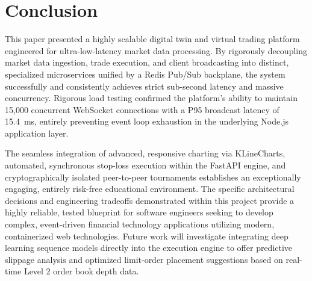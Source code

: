 \documentclass[conference]{IEEEtran}
\begin{document}
\begin{table}[h]
\centering
\caption{Projected SaaS Infrastructure Costs (Per 10,000 Users)}
\label{tab:budget}
\end{table}

\section{Conclusion}

This paper presented a highly scalable digital twin and virtual trading platform engineered for ultra-low-latency market data processing. By rigorously decoupling market data ingestion, trade execution, and client broadcasting into distinct, specialized microservices unified by a Redis Pub/Sub backplane, the system successfully and consistently achieves strict sub-second latency and massive concurrency. Rigorous load testing confirmed the platform's ability to maintain 15,000 concurrent WebSocket connections with a P95 broadcast latency of 15.4~ms, entirely preventing event loop exhaustion in the underlying Node.js application layer. 

The seamless integration of advanced, responsive charting via KLineCharts, automated, synchronous stop-loss execution within the FastAPI engine, and cryptographically isolated peer-to-peer tournaments establishes an exceptionally engaging, entirely risk-free educational environment. The specific architectural decisions and engineering tradeoffs demonstrated within this project provide a highly reliable, tested blueprint for software engineers seeking to develop complex, event-driven financial technology applications utilizing modern, containerized web technologies. Future work will investigate integrating deep learning sequence models directly into the execution engine to offer predictive slippage analysis and optimized limit-order placement suggestions based on real-time Level 2 order book depth data.
\end{document}
